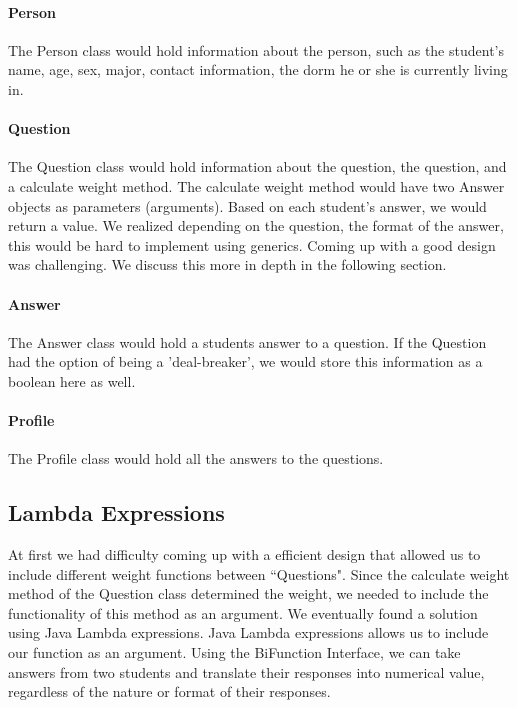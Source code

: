 \documentclass[12pt]{article}
\begin{document}
\paragraph{Person} The Person class would hold information about the person, such as the student's name, age, sex, major, contact information, the dorm he or she is currently living in.
\paragraph{Question}
The Question class would hold information about the question, the question, and a calculate weight method. The calculate weight method would have two Answer objects as parameters (arguments). Based on each student's answer, we would return a value. We realized depending on the question, the format of the answer, this would be hard to implement using generics. Coming up with a good design was challenging. We discuss this more in depth in the following section. 

\paragraph{Answer} The Answer class would hold a students answer to a question. If the Question had the option of being a 'deal-breaker', we would store this information as a boolean here as well.
\paragraph{Profile} The Profile class would hold all the answers to the questions.  

\subsection{Lambda Expressions}
At first we had difficulty coming up with a efficient design that allowed us to include different weight functions between ``Questions". Since the calculate weight method of the Question class determined the weight, we needed to include the functionality of this method as an argument. We eventually found a solution using Java Lambda expressions. Java Lambda expressions allows us to include our function as an argument. Using the BiFunction Interface, we can take answers from two students and translate their responses into numerical value, regardless of the nature or format of their responses. 
\end{document}
